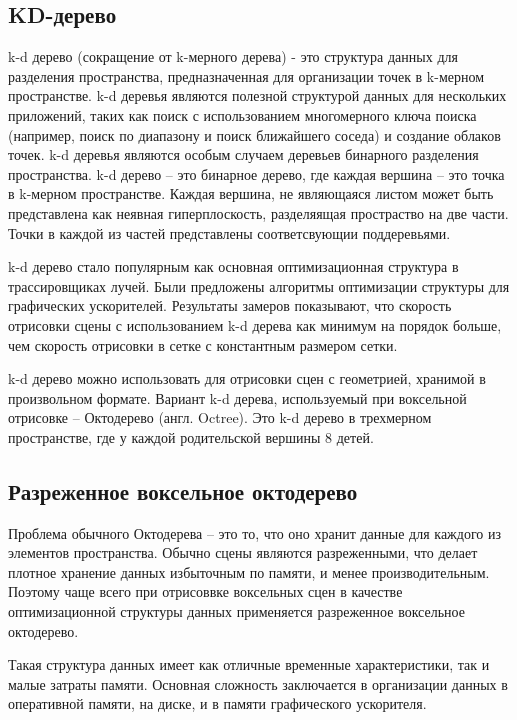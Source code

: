 \subsection{KD-дерево}

k-d дерево (сокращение от k-мерного дерева) - это структура данных 
для разделения пространства, предназначенная для организации точек в 
k-мерном пространстве. k-d деревья являются полезной структурой данных 
для нескольких приложений, таких как поиск с использованием многомерного 
ключа поиска (например, поиск по диапазону и поиск ближайшего соседа) и 
создание облаков точек. k-d деревья являются особым случаем деревьев 
бинарного разделения пространства. k-d дерево -- это бинарное дерево, где каждая 
вершина -- это точка в k-мерном пространстве. Каждая вершина, не являющаяся листом 
может быть представлена как неявная гиперплоскость, разделяящая простраство на две части.
Точки в каждой из частей представлены соответсвующии поддеревьями.

k-d дерево стало популярным как основная оптимизационная структура в 
трассировщиках лучей. Были предложены алгоритмы оптимизации структуры для графических
ускорителей. Результаты замеров показывают, что скорость отрисовки сцены с использованием
k-d дерева как минимум на порядок больше, чем скорость отрисовки в сетке с константным 
размером сетки.

k-d дерево можно использовать для отрисовки сцен с геометрией, хранимой в произвольном 
формате. Вариант k-d дерева, используемый при воксельной отрисовке -- Октодерево (англ. Octree). Это k-d дерево в трехмерном пространстве, где у каждой родительской вершины 8 детей.~\cite{KDTASfaGR}

\subsection{Разреженное воксельное октодерево}

Проблема обычного Октодерева -- это то, что оно хранит данные для каждого из элементов 
пространства. Обычно сцены являются разреженными, что делает плотное хранение данных
избыточным по памяти, и менее производительным. Поэтому чаще всего при отрисоввке
воксельных сцен в качестве оптимизационной структуры данных применяется разреженное воксельное
октодерево.

Такая структура данных имеет как отличные временные характеристики, так и малые затраты памяти.
Основная сложность заключается в организации данных в оперативной памяти, на диске, 
и в памяти графического ускорителя.~\cite{ESVOAEaI}

